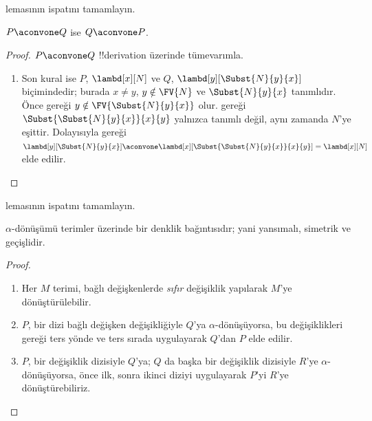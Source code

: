 \begin{prob}
   lemasının ispatını tamamlayın.
\end{prob}

\begin{lem}
  $P \aconvone Q$ ise $Q \aconvone P$.
\end{lem}

\begin{proof}
  $P \aconvone Q$ !!{derivation} üzerinde tümevarımla.
  \begin{enumerate}
  \item Son kural  ise $P$, $\lambd[x][N]$ ve $Q$,
    $\lambd[y][\Subst{N}{y}{x}]$ biçimindedir; burada $x\neq y$,
    $y\notin\FV{N}$ ve $\Subst{N}{y}{x}$ tanımlıdır. Önce
     gereği
    $y\notin\FV{\Subst{N}{y}{x}}$ olur.  gereği
    $\Subst{\Subst{N}{y}{x}}{x}{y}$ yalnızca tanımlı değil, aynı zamanda
    $N$'ye eşittir. Dolayısıyla  gereği
    $\lambd[y][\Subst{N}{y}{x}]
    \aconvone \lambd[x][\Subst{\Subst{N}{y}{x}}{x}{y}] =
    \lambd[x][N]$ elde edilir.
  \end{enumerate}
\end{proof}

\begin{prob}
   lemasının ispatını tamamlayın.
\end{prob}

\begin{thm}
  $\alpha$-dönüşümü terimler üzerinde bir denklik bağıntısıdır; yani
  yansımalı, simetrik ve geçişlidir.
\end{thm}

\begin{proof}
  \begin{enumerate}
  \item Her $M$ terimi, bağlı değişkenlerde \emph{sıfır} değişiklik yapılarak
    $M$'ye dönüştürülebilir.
  \item $P$, bir dizi bağlı değişken değişikliğiyle $Q$'ya
    $\alpha$-dönüşüyorsa, bu değişiklikleri  gereği ters
    yönde ve ters sırada uygulayarak $Q$'dan $P$ elde edilir.
  \item $P$, bir değişiklik dizisiyle $Q$'ya; $Q$ da başka bir değişiklik
    dizisiyle $R$'ye $\alpha$-dönüşüyorsa, önce ilk, sonra ikinci diziyi
    uygulayarak $P$'yi $R$'ye dönüştürebiliriz.
  \end{enumerate}
\end{proof}

